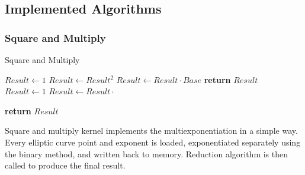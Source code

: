 \subsection{Implemented Algorithms}


\subsubsection{Square and Multiply}

\begin{algorithm}
    \caption{Square and Multiply}\label{multiexp}
    \begin{algorithmic}[1]
    
        \State $Result \gets 1$
            \State $Result \gets Result^2$
                \State $Result \gets Result \cdot Base$
            \EndIf
        \EndFor
        \State \textbf{return} $Result$
    \EndFunction
    \\
        \State $Result \gets 1$
            \State $Result \gets Result \cdot $
        \EndFor
    
        \State \textbf{return} $Result$
        
    \EndFunction
    \end{algorithmic}
\end{algorithm}
Square and multiply kernel implements the multiexponentiation in a simple way. Every elliptic curve point and exponent is loaded, exponentiated separately using the binary method, and written back to memory. Reduction algorithm is then called to produce the final result.
